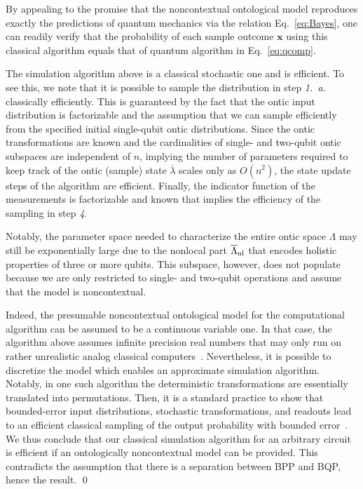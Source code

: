 \documentclass[prl,twocolumn,amsmath,amssymb,nofootinbib]{revtex4-1}
\newcommand\s[1]{_{\rm #1}}
\begin{document}
By appealing to the promise that the noncontextual ontological model reproduces exactly the predictions of quantum mechanics via the relation Eq.~\eqref{eq:Bayes}, one can readily verify that the probability of each sample outcome $\mathbf{x}$ using this classical algorithm equals that of quantum algorithm in Eq.~\eqref{eq:qcomp}.

%
The simulation algorithm above is a classical stochastic one and is efficient.
To see this, we note that it is possible to sample the distribution in step \textit{1.~a.} classically efficiently.
This is guaranteed by the fact that the ontic input distribution is factorizable and the assumption that we can sample efficiently from the specified initial single-qubit ontic distributions. 
Since the ontic transformations are known and the cardinalities of single- and two-qubit ontic subspaces are independent of $n$, implying the number of parameters required to keep track of the ontic (sample) state $\overline{\lambda}$ scales only as $O(n^2)$, the state update steps of the algorithm are efficient.
Finally, the indicator function of the measurements is factorizable and known that implies the efficiency of the sampling in step \textit{4}.

Notably, the parameter space needed to characterize the entire ontic space $\Lambda$ may still be exponentially large due to the nonlocal part $\overline{\Lambda}\s{nl}$ that encodes holistic properties of three or more qubits.
This subspace, however, does not populate because we are only restricted to single- and two-qubit operations and assume that the model is noncontextual.

Indeed, the presumable noncontextual ontological model for the computational algorithm can be assumed to be a continuous variable one.
In that case, the algorithm above assumes infinite precision real numbers that may only run on rather unrealistic analog classical computers~\cite{Vergis1986}.
Nevertheless, it is possible to discretize the model which enables an approximate simulation algorithm.
Notably, in one such algorithm the deterministic transformations are essentially translated into permutations.
Then, it is a standard practice to show that bounded-error input distributions, stochastic transformations, and readouts lead to an efficient classical sampling of the output probability with bounded error~\cite{Veitch2012,Mari2012}.
We thus conclude that our classical simulation algorithm for an arbitrary circuit is efficient if an ontologically noncontextual model can be provided.
This contradicts the assumption that there is a separation between BPP and BQP, hence the result.
\qed   
\end{document}
